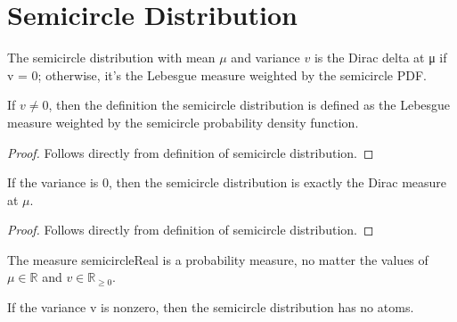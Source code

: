 

\section{Semicircle Distribution}




\begin{definition}
    \label{def:semicircle_distribution}
    \leanok
    The semicircle distribution with mean $\mu$ and variance $v$ is the Dirac delta at μ if v = 0; otherwise, it's the Lebesgue measure weighted by the semicircle PDF.
\end{definition}

\begin{lemma}
    \label{lemma:semicircleReal_of_var_ne_zero}
    \leanok
    If $v \neq 0$, then the definition the semicircle distribution is defined as the Lebesgue measure weighted by the semicircle probability density function.
\end{lemma}

\begin{proof}
    Follows directly from definition of semicircle distribution.
\end{proof}

\begin{lemma}
    \label{lemma:semicircleReal_zero_var}
    \leanok
    If the variance is 0, then the semicircle distribution is exactly the Dirac measure at $\mu$.
\end{lemma}

\begin{proof}
    Follows directly from definition of semicircle distribution.
\end{proof}

\begin{lemma} %
    \label{lemma:instIsProbabilityMeasuresemicircleReal}
    \leanok
    The measure semicircleReal is a probability measure, no matter the values of $\mu \in \mathbb{R}$ and $v \in \mathbb{R}_{\ge 0}$.
\end{lemma}


\begin{lemma}
    \label{lemma:noAtoms_semicircleReal}
    \leanok
    If the variance v is nonzero, then the semicircle distribution has no atoms.
\end{lemma}

